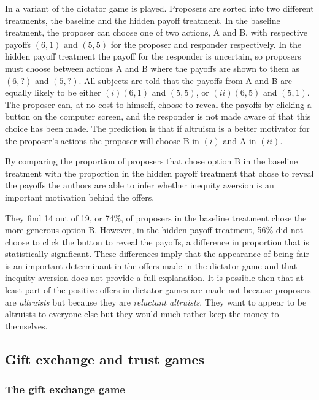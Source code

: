 \documentclass[12pt]{article}
\begin{document}
In \cite{dana2007exploiting} a variant of the dictator game is played. Proposers are sorted into two different treatments, the baseline and the hidden payoff treatment. In the baseline treatment, the proposer can choose one of two actions, A and B, with respective payoffs $\left(6,1\right)$ and $\left(5,5\right)$ for the proposer and responder respectively. In the hidden payoff treatment the payoff for the responder is uncertain, so proposers must choose between actions A and B where the payoffs are shown to them as $\left(6,?\right)$ and $\left(5,?\right)$. All subjects are told that the payoffs from A and B are equally likely to be either $\left(i\right)\left(6,1\right)$ and $\left(5,5\right)$, or $ \left(ii\right)\left(6,5\right)$ and $\left(5,1\right)$. The proposer can, at no cost to himself, choose to reveal the payoffs by clicking a button on the computer screen, and the responder is not made aware of that this choice has been made. The prediction is that if altruism is a better motivator for the proposer's actions the proposer will choose B in $\left(i\right)$ and A in $\left(ii\right)$. 

By comparing the proportion of proposers that chose option B in the baseline treatment with the proportion in the hidden payoff treatment that chose to reveal the payoffs the authors are able to infer whether inequity aversion is an important motivation behind the offers.

They find 14 out of 19, or 74\%, of proposers in the baseline treatment chose the more generous option B. However, in the hidden payoff treatment, 56\% did not choose to click the button to reveal the payoffs, a difference in proportion that is statistically significant. These differences imply that the appearance of being fair is an important determinant in the offers made in the dictator game and that inequity aversion does not provide a full explanation. It is possible then that at least part of the positive offers in dictator games are made not because proposers are \textit{altruists} but because they are \textit{reluctant altruists}. They want to appear to be altruists to everyone else but they would much rather keep the money to themselves.

\subsection{Gift exchange and trust games}
\subsubsection{The gift exchange game}
\end{document}
